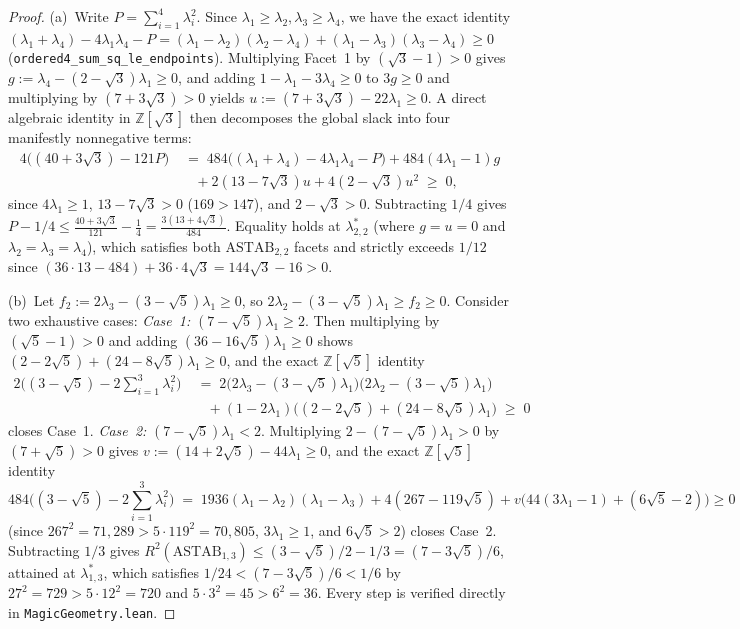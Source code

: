 \documentclass[11pt,reqno]{amsart}
\theoremstyle{definition}
\newcommand{\ZZ}{\mathbb{Z}}
\newcommand{\ASTAB}{\mathrm{ASTAB}}
\newcommand{\lid}[1]{{\footnotesize\nolinkurl{#1}}}
\begin{document}
\begin{proof}
(a)~Write $P = \sum_{i=1}^4 \lambda_i^2$. Since $\lambda_1 \ge \lambda_2, \lambda_3 \ge
\lambda_4$, we have the exact identity $(\lambda_1 + \lambda_4) - 4\lambda_1\lambda_4 - P
= (\lambda_1 - \lambda_2)(\lambda_2 - \lambda_4) + (\lambda_1 - \lambda_3)(\lambda_3 -
\lambda_4) \ge 0$ (\lid{ordered4_sum_sq_le_endpoints}). Multiplying Facet~1 by
$(\sqrt{3} - 1) > 0$ gives $g := \lambda_4 - (2 - \sqrt{3})\lambda_1 \ge 0$, and adding
$1 - \lambda_1 - 3\lambda_4 \ge 0$ to $3g \ge 0$ and multiplying by $(7 + 3\sqrt{3}) > 0$
yields $u := (7 + 3\sqrt{3}) - 22\lambda_1 \ge 0$. A direct algebraic identity in
$\ZZ[\sqrt{3}]$ then decomposes the global slack into four manifestly nonnegative terms:
\begin{align*}
  4\big((40 + 3\sqrt{3}) - 121 P\big)
  &\;=\; 484\big((\lambda_1 + \lambda_4) - 4\lambda_1\lambda_4 - P\big)
     + 484(4\lambda_1 - 1)g \\
  &\quad + 2(13 - 7\sqrt{3}) u + 4(2 - \sqrt{3}) u^2 \;\ge\; 0,
\end{align*}
since $4\lambda_1 \ge 1$, $13 - 7\sqrt{3} > 0$ ($169 > 147$), and $2 - \sqrt{3} > 0$.
Subtracting $1/4$ gives $P - 1/4 \le \frac{40 + 3\sqrt{3}}{121} - \frac{1}{4} =
\frac{3(13 + 4\sqrt{3})}{484}$. Equality holds at $\lambda^*_{2,2}$ (where $g = u = 0$
and $\lambda_2 = \lambda_3 = \lambda_4$), which satisfies both $\ASTAB_{2,2}$ facets and
strictly exceeds $1/12$ since $(36\cdot 13 - 484) + 36\cdot 4\sqrt{3} = 144\sqrt{3} - 16
> 0$.

(b)~Let $f_2 := 2\lambda_3 - (3 - \sqrt{5})\lambda_1 \ge 0$, so $2\lambda_2 -
(3 - \sqrt{5})\lambda_1 \ge f_2 \ge 0$. Consider two exhaustive cases:
\emph{Case~1:} $(7 - \sqrt{5})\lambda_1 \ge 2$. Then multiplying by $(\sqrt{5}-1) > 0$
and adding $(36 - 16\sqrt{5})\lambda_1 \ge 0$ shows $(2 - 2\sqrt{5}) + (24 - 8\sqrt{5})
\lambda_1 \ge 0$, and the exact $\ZZ[\sqrt{5}]$ identity
\begin{align*}
  2\big((3 - \sqrt{5}) - 2\sum_{i=1}^3 \lambda_i^2\big)
  &\;=\; 2\big(2\lambda_3 - (3-\sqrt{5})\lambda_1\big)\big(2\lambda_2 - (3-\sqrt{5})\lambda_1\big) \\
  &\quad + (1 - 2\lambda_1)\big((2 - 2\sqrt{5}) + (24 - 8\sqrt{5})\lambda_1\big) \;\ge\; 0
\end{align*}
closes Case~1.
\emph{Case~2:} $(7 - \sqrt{5})\lambda_1 < 2$. Multiplying $2 - (7-\sqrt{5})\lambda_1 > 0$
by $(7 + \sqrt{5}) > 0$ gives $v := (14 + 2\sqrt{5}) - 44\lambda_1 \ge 0$, and the exact
$\ZZ[\sqrt{5}]$ identity
\[
  484\big((3-\sqrt{5}) - 2\sum_{i=1}^3\lambda_i^2\big)
  \;=\; 1936(\lambda_1 - \lambda_2)(\lambda_1 - \lambda_3)
      + 4(267 - 119\sqrt{5})
      + v\big(44(3\lambda_1 - 1) + (6\sqrt{5} - 2)\big) \ge 0
\]
(since $267^2 = 71{,}289 > 5 \cdot 119^2 = 70{,}805$, $3\lambda_1 \ge 1$, and
$6\sqrt{5} > 2$) closes Case~2. Subtracting $1/3$ gives $R^2(\ASTAB_{1,3}) \le
(3-\sqrt{5})/2 - 1/3 = (7-3\sqrt{5})/6$, attained at $\lambda^*_{1,3}$, which satisfies
$1/24 < (7-3\sqrt{5})/6 < 1/6$ by $27^2 = 729 > 5\cdot 12^2 = 720$ and $5\cdot 3^2 = 45 >
6^2 = 36$. Every step is verified directly in \lid{MagicGeometry.lean}.
\end{proof}
\end{document}
